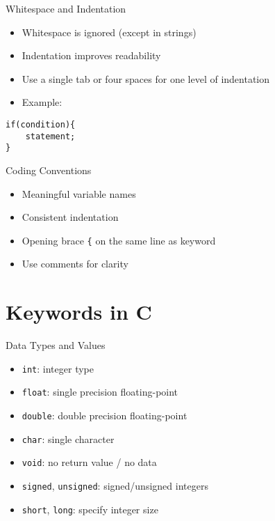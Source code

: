\documentclass[12pt, aspectratio=169]{beamer}
\begin{document}
    \begin{frame}[fragile]{Whitespace and Indentation}
        \begin{itemize}
            \item Whitespace is ignored (except in strings)
            \item Indentation improves readability
            \item Use a single tab or four spaces for one level of indentation
            \item Example:
        \end{itemize}
        \begin{verbatim}
if(condition){
    statement;
}
        \end{verbatim}
    \end{frame}


    \begin{frame}{Coding Conventions}
        \begin{itemize}
            \item Meaningful variable names
            \item Consistent indentation
            \item Opening brace \texttt{\{} on the same line as keyword
            \item Use comments for clarity
        \end{itemize}
    \end{frame}


    \section{Keywords in C}

    \begin{frame}{Data Types and Values}
        \begin{itemize}
            \item \texttt{int}: integer type
            \item \texttt{float}: single precision floating-point
            \item \texttt{double}: double precision floating-point
            \item \texttt{char}: single character
            \item \texttt{void}: no return value / no data
            \item \texttt{signed}, \texttt{unsigned}: signed/unsigned integers
            \item \texttt{short}, \texttt{long}: specify integer size
        \end{itemize}
    \end{frame}
\end{document}
